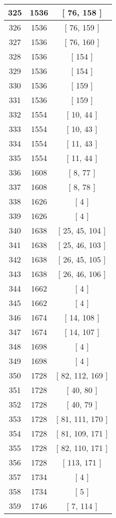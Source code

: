 \begin{center}
\begin{longtable}[H]{|| c c c ||}
325 & 1536 & [ 76, 158 ] \\ 
\hline
326 & 1536 & [ 76, 159 ] \\ 
\hline
327 & 1536 & [ 76, 160 ] \\ 
\hline
328 & 1536 & [ 154 ] \\ 
\hline
329 & 1536 & [ 154 ] \\ 
\hline
330 & 1536 & [ 159 ] \\ 
\hline
331 & 1536 & [ 159 ] \\ 
\hline
332 & 1554 & [ 10, 44 ] \\ 
\hline
333 & 1554 & [ 10, 43 ] \\ 
\hline
334 & 1554 & [ 11, 43 ] \\ 
\hline
335 & 1554 & [ 11, 44 ] \\ 
\hline
336 & 1608 & [ 8, 77 ] \\ 
\hline
337 & 1608 & [ 8, 78 ] \\ 
\hline
338 & 1626 & [ 4 ] \\ 
\hline
339 & 1626 & [ 4 ] \\ 
\hline
340 & 1638 & [ 25, 45, 104 ] \\ 
\hline
341 & 1638 & [ 25, 46, 103 ] \\ 
\hline
342 & 1638 & [ 26, 45, 105 ] \\ 
\hline
343 & 1638 & [ 26, 46, 106 ] \\ 
\hline
344 & 1662 & [ 4 ] \\ 
\hline
345 & 1662 & [ 4 ] \\ 
\hline
346 & 1674 & [ 14, 108 ] \\ 
\hline
347 & 1674 & [ 14, 107 ] \\ 
\hline
348 & 1698 & [ 4 ] \\ 
\hline
349 & 1698 & [ 4 ] \\ 
\hline
350 & 1728 & [ 82, 112, 169 ] \\ 
\hline
351 & 1728 & [ 40, 80 ] \\ 
\hline
352 & 1728 & [ 40, 79 ] \\ 
\hline
353 & 1728 & [ 81, 111, 170 ] \\ 
\hline
354 & 1728 & [ 81, 109, 171 ] \\ 
\hline
355 & 1728 & [ 82, 110, 171 ] \\ 
\hline
356 & 1728 & [ 113, 171 ] \\ 
\hline
357 & 1734 & [ 4 ] \\ 
\hline
358 & 1734 & [ 5 ] \\ 
\hline
359 & 1746 & [ 7, 114 ] \\ 

\end{longtable}
\end{center}
